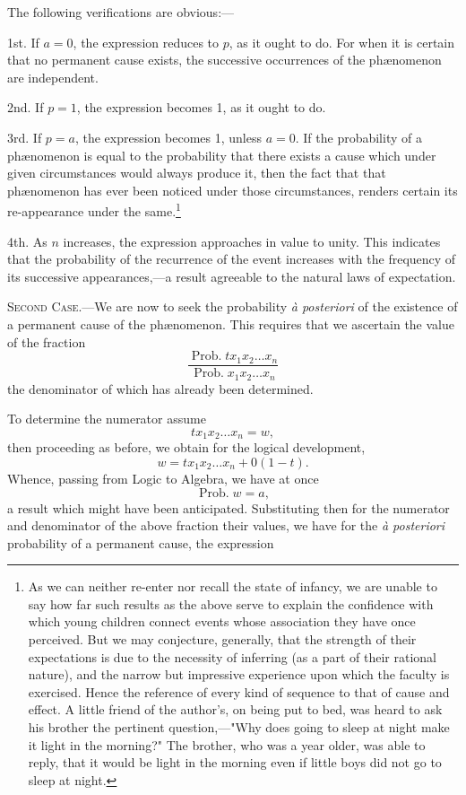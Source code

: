 \documentclass[oneside]{book}
\begin{document}
The following verifications are obvious:---

1st. If $a =0$, the expression reduces to $p$, as it ought to do.
For when it is certain that no permanent cause exists, the successive occurrences of the ph{\ae}nomenon are independent.

2nd. If $p = 1$, the expression becomes 1, as it ought to do.

3rd. If $p = a$, the expression becomes 1, unless $a = 0$. If the
probability of a ph{\ae}nomenon is equal to the probability that there
exists a cause which under given circumstances would always
produce it, then the fact that that ph\ae nomenon has ever been noticed under those circumstances, renders certain its re-appearance
under the same.\footnote{As we can neither re-enter nor recall the state of infancy, we are unable to
say how far such results as the above serve to explain the confidence with which
young children connect events whose association they have once perceived.
But we may conjecture, generally, that the strength of their expectations is
due to the necessity of inferring (as a part of their rational nature), and the
narrow but impressive experience upon which the faculty is exercised.  Hence
the reference of every kind of sequence to that of cause and effect. A little
friend of the author's, on being put to bed, was heard to ask his brother the
pertinent question,---"Why does going to sleep at night make it light in the
morning?"  The brother, who was a year older, was able to reply, that it
would be light in the morning even if little boys did not go to sleep at night.}%

4th.  As $n$ increases, the expression approaches in value to
unity.  This indicates that the probability of the recurrence of
the event increases with the frequency of its successive appearances,---a result agreeable to the natural laws of expectation.

\textsc{Second Case}.---We are now to seek the probability \textit{\`{a} posteriori} of the existence of a permanent cause of the
ph\ae nomenon.
This requires that we ascertain the value of the fraction
\[
  \frac{\operatorname{Prob. } t x_1 x_2 \dotsc x_n}
       {\operatorname{Prob. }   x_1 x_2 \dotsc x_n}
\]
the denominator of which has already been determined.

To determine the numerator assume
\[
  t x_1 x_2 \dotsc x_n = w,
\]
then proceeding as before, we obtain for the logical development,
\[
  w = t x_1 x_2 \dotsc x_n + 0 (1-t).
\]
Whence, passing from Logic to Algebra, we have at once
\[
  \operatorname{Prob. } w = a,
\]
a result which might have been anticipated.  Substituting then
for the numerator and denominator of the above fraction their
values, we have for the \textit{\`{a} posteriori} probability of a permanent
cause, the expression
\end{document}
